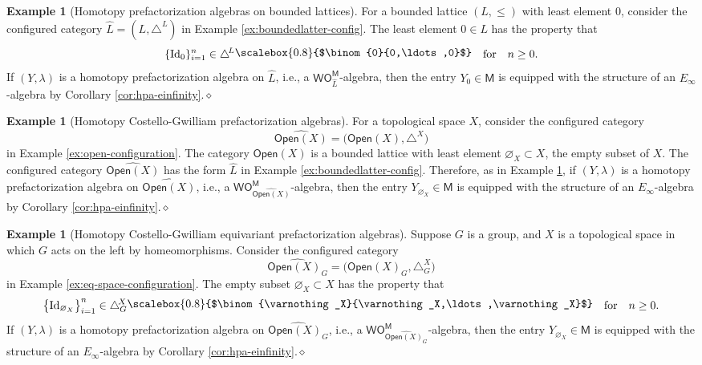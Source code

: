 \documentclass[11pt]{amsbook}
\numberwithin{section}{chapter}
\numberwithin{subsection}{section}
\numberwithin{equation}{section}
\theoremstyle{plain}
\theoremstyle{definition}
\newtheorem{example}[equation]{Example}
\newcommand{\M}{\mathsf{M}}
\renewcommand{\O}{\mathsf{O}}
\newcommand{\Otom}{\O^{\M}}
\newcommand{\W}{\mathsf{W}}
\newcommand{\Id}{\mathrm{Id}}
\newcommand{\dqed}{\hfill$\diamond$}
\newcommand{\Config}{\triangle} %
\newcommand{\Configl}{\Config^{\! L}}
\newcommand{\Configx}{\Config^{\! X}}
\newcommand{\Configxg}{\Configx_G}
\newcommand{\Lhat}{\widehat{L}}
\newcommand{\Open}{\mathsf{Open}}
\newcommand{\Openx}{\Open(X)}
\newcommand{\Openxhat}{\widehat{\Openx}}
\newcommand{\Openxg}{\Openx_G}
\newcommand{\Openxghat}{\widehat{\Openxg}}
\newcommand{\wom}{\W\Otom}
\newcommand{\wolhatm}{\wom_{\Lhat}}
\newcommand{\smallprof}[1]
{\raisebox{.05cm}{\scalebox{0.8}{#1}}}
\newcommand{\sbinom}[2]{\raisebox{.05cm}{\scalebox{0.8}{$\binom{#1}{#2}$}}}
\newcommand{\zerozerozero}{\smallprof{$\binom{0}{0,\ldots,0}$}}
\newcommand{\forspace}{\quad\text{for}\quad}
\begin{document}
\begin{example}[Homotopy prefactorization algebras on bounded lattices]\label{ex:hpa-einfinity-lattice} 
For a bounded lattice $(L,\leq)$ with least element $0$, consider the configured category $\Lhat = (L,\Configl)$ in Example \ref{ex:boundedlatter-config}.  The least element $0 \in L$ has the property that \[\{\Id_0\}_{i=1}^n \in \Configl\zerozerozero \forspace n\geq 0.\]  If $(Y,\lambda)$ is a homotopy prefactorization algebra on $\Lhat$, i.e., a $\wolhatm$-algebra, then the entry $Y_0 \in \M$ is equipped with the structure of an $E_\infty$-algebra by Corollary \ref{cor:hpa-einfinity}.\dqed
\end{example}

\begin{example}[Homotopy Costello-Gwilliam prefactorization algebras]\label{ex:hpa-einfinity-cg}
For a topological space $X$, consider the configured category \[\Openxhat =\bigl(\Openx,\Configx\bigr)\] in Example \ref{ex:open-configuration}.  The category $\Openx$ is a bounded lattice with least element $\varnothing_X \subset X$, the empty subset of $X$.  The configured category $\Openxhat$ has the form $\Lhat$ in Example \ref{ex:boundedlatter-config}.  Therefore, as in Example \ref{ex:hpa-einfinity-lattice}, if $(Y,\lambda)$ is a homotopy prefactorization algebra on $\Openxhat$, i.e., a $\wom_{\Openxhat}$-algebra, then the entry $Y_{\varnothing_X} \in \M$ is equipped with the structure of an $E_\infty$-algebra by Corollary \ref{cor:hpa-einfinity}.\dqed
\end{example}

\begin{example}[Homotopy Costello-Gwilliam equivariant prefactorization algebras]\label{ex:hpa-einfinty-cgeq}
Suppose $G$ is a group, and $X$ is a topological space in which $G$ acts on the left by homeomorphisms.  Consider the configured category \[\Openxghat =\bigl(\Openxg,\Configxg\bigr)\] in Example \ref{ex:eq-space-configuration}.  The empty subset $\varnothing_X \subset X$ has the property that \[\bigl\{\Id_{\varnothing_X}\bigr\}_{i=1}^n \in \Configxg\sbinom{\varnothing_X}{\varnothing_X,\ldots,\varnothing_X} \forspace n\geq 0.\] If $(Y,\lambda)$ is a homotopy prefactorization algebra on $\Openxghat$, i.e., a $\wom_{\Openxghat}$-algebra, then the entry $Y_{\varnothing_X} \in \M$ is equipped with the structure of an $E_\infty$-algebra by Corollary \ref{cor:hpa-einfinity}.\dqed
\end{example}
\end{document}
